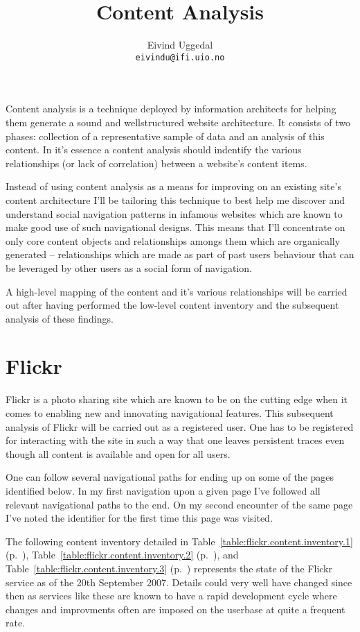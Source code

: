 \documentclass[12pt,a4paper]{article}
\title{Content Analysis}
\author{Eivind Uggedal\\
        \texttt{eivindu@ifi.uio.no}}
\date{}
\begin{document}
\maketitle{}

Content analysis is a technique deployed by information architects for helping
them generate a sound and wellstructured website architecture. It consists of
two phases: collection of a representative sample of data and an analysis of
this content. In it's essence a content analysis should indentify the various
relationships (or lack of correlation) between a website's content items.

Instead of using content analysis as a means for improving on an existing
site's content architecture I'll be tailoring this technique to best help me
discover and understand social navigation patterns in infamous websites which
are known to make good use of such navigational designs. This means that I'll
concentrate on only core content objects and relationships amongs them
which are organically generated -- relationships which are made as part of
past users behaviour that can be leveraged by other users as a social form
of navigation.

A high-level mapping of the content and it's various relationships
will be carried out after having performed the low-level content inventory
and the subsequent analysis of these findings.

\section{Flickr}

Flickr is a photo sharing site which are known to be on the cutting edge when
it comes to enabling new and innovating navigational features. This subsequent
analysis of Flickr will be carried out as a registered user. One has to be
registered for interacting with the site in such a way that one leaves
persistent traces even though all content is available and open for all users.

One can follow several navigational paths for ending up on some of the pages
identified below. In my first navigation upon a given page I've followed all
relevant navigational paths to the end. On my second encounter of the same
page I've noted the identifier for the first time this page was visited.

The following content inventory detailed in
Table~\ref{table:flickr.content.inventory.1}
(p.~\pageref{table:flickr.content.inventory.1}),
Table~\ref{table:flickr.content.inventory.2}
(p.~\pageref{table:flickr.content.inventory.2}), and
Table~\ref{table:flickr.content.inventory.3}
(p.~\pageref{table:flickr.content.inventory.3})
represents the state of the Flickr service as of the 20th September 2007.
Details could very well have changed since then as
services like these are known to have a rapid development cycle
where changes and improvments often are imposed on the userbase at quite
a frequent rate.
\end{document}
